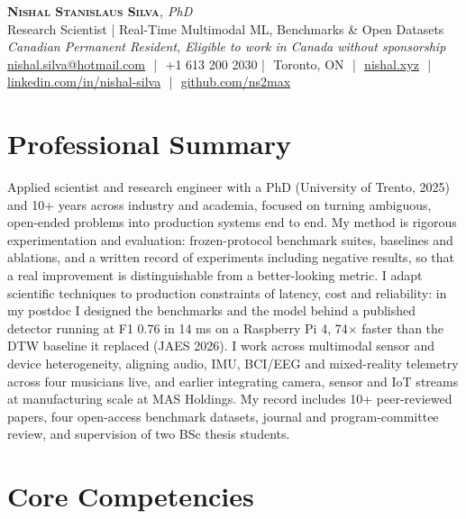 \documentclass[11pt]{article}
\makeatletter
\newcommand{\cvName}{Nishal Stanislaus Silva}
\newcommand{\cvEmail}{nishal.silva@hotmail.com}
\newcommand{\cvPhone}{+1 613 200 2030}
\newcommand{\cvCity}{Toronto, ON}
\newcommand{\cvSite}{https://nishal.xyz}
\newcommand{\cvLinkedIn}{https://www.linkedin.com/in/nishal-silva}
\newcommand{\cvGitHub}{https://github.com/ns2max}
\newcommand{\cvStatus}{Canadian Permanent Resident, Eligible to work in Canada without sponsorship}
\newcommand{\cvTagline}{Research Scientist | Real-Time Multimodal ML, Benchmarks \& Open Datasets}
\makeatother
\begin{document}
\pagestyle{empty}
\begin{center}
    {\LARGE \scshape \textbf{\cvName}}{\large \textit{, PhD}}\\[1pt]
    {\small \cvTagline}\\[1pt]
    {\footnotesize\textit{\cvStatus}}\\[1pt]
    {\small
    \href{mailto:\cvEmail}{\cvEmail} \,\,|\,\, \cvPhone \,\,|\,\, \cvCity
    \,\,|\,\, \href{\cvSite}{nishal.xyz} \,\,|\,\, \href{\cvLinkedIn}{linkedin.com/in/nishal-silva}
    \,\,|\,\, \href{\cvGitHub}{github.com/ns2max}}
\end{center}

\section*{Professional Summary}

Applied scientist and research engineer with a PhD (University of Trento, 2025) and 10+ years across industry and academia, focused on turning ambiguous, open-ended problems into production systems end to end. My method is rigorous experimentation and evaluation: frozen-protocol benchmark suites, baselines and ablations, and a written record of experiments including negative results, so that a real improvement is distinguishable from a better-looking metric. I adapt scientific techniques to production constraints of latency, cost and reliability: in my postdoc I designed the benchmarks and the model behind a published detector running at F1 0.76 in 14 ms on a Raspberry Pi 4, 74$\times$ faster than the DTW baseline it replaced (JAES 2026). I work across multimodal sensor and device heterogeneity, aligning audio, IMU, BCI/EEG and mixed-reality telemetry across four musicians live, and earlier integrating camera, sensor and IoT streams at manufacturing scale at MAS Holdings. My record includes 10+ peer-reviewed papers, four open-access benchmark datasets, journal and program-committee review, and supervision of two BSc thesis students.

\section*{Core Competencies}
\end{document}
